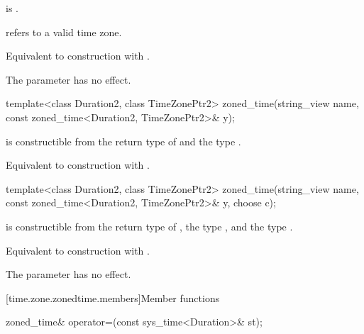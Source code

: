 \begin{itemdescr}
\pnum
\constraints
{} is .

\pnum
\expects
{} refers to a valid time zone.

\pnum
\effects
Equivalent to construction with .

\pnum
\begin{note}
The  parameter has no effect.
\end{note}
\end{itemdescr}

\begin{itemdecl}
template<class Duration2, class TimeZonePtr2>
  zoned_time(string_view name, const zoned_time<Duration2, TimeZonePtr2>& y);
\end{itemdecl}

\begin{itemdescr}
\pnum
\constraints
{} is constructible from
the return type of  and
the type .

\pnum
\effects
Equivalent to construction with .
\end{itemdescr}

\begin{itemdecl}
template<class Duration2, class TimeZonePtr2>
  zoned_time(string_view name, const zoned_time<Duration2, TimeZonePtr2>& y, choose c);
\end{itemdecl}

\begin{itemdescr}
\pnum
\constraints
{} is constructible from
the return type of ,
the type , and
the type .

\pnum
\effects
Equivalent to construction with .

\pnum
\begin{note}
The  parameter has no effect.
\end{note}
\end{itemdescr}
%

[time.zone.zonedtime.members]{Member functions}

%
\begin{itemdecl}
zoned_time& operator=(const sys_time<Duration>& st);
\end{itemdecl}

